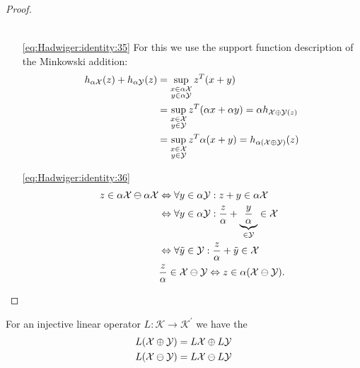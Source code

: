 \begin{proof}
\begin{itemize}
\begin{equation}
\begin{aligned}
	\end{aligned}
\end{equation}
%
\item[\eqref{eq:Hadwiger:identity:35}]
For this we use the support function description of the Minkowski addition:
%
\begin{equation}\begin{aligned}
	h_{\alpha\mathcal X}(z)+h_{\alpha\mathcal Y}(z) &= \sup_{\substack{x\in\alpha\mathcal X\\ y\in\alpha\mathcal Y}}z^T(x+y)\\
	 &= \sup_{\substack{x\in\mathcal X\\ y\in\mathcal Y}} z^T(\alpha x+\alpha y)	 = \alpha h_{\mathcal X\oplus\mathcal Y(z)} \\
	 &= \sup_{\substack{x\in\mathcal X\\ y\in\mathcal Y}} z^T\alpha(x+y) = h_{\alpha(\mathcal X\oplus\mathcal Y)}(z)
\end{aligned}\end{equation}
%
\item[\eqref{eq:Hadwiger:identity:36}]
%
\begin{equation}\begin{aligned}
	z\in\alpha\mathcal X\ominus\alpha\mathcal X&\Leftrightarrow \forall y\in\alpha\mathcal Y: z+y\in\alpha\mathcal X\\
	&\Leftrightarrow \forall y\in\alpha\mathcal Y: \frac{z}{\alpha} + \underbrace{\frac{y}{\alpha}}_{\in\mathcal Y}\in\mathcal X\\
	&\Leftrightarrow \forall \tilde y\in\mathcal Y: \frac{z}{\alpha} + \tilde y\in\mathcal X\\
	& \frac{z}{\alpha}\in\mathcal X\ominus\mathcal Y \Leftrightarrow z\in\alpha(\mathcal X\ominus\mathcal Y).
\end{aligned}\end{equation}
\end{itemize}
%
\end{proof}
%
\mysplit For an injective linear operator $L:\mathcal K\rightarrow \mathcal K^\prime$ we have the 
%
\begin{equation}\begin{aligned}
	L(\mathcal X\oplus\mathcal Y) &= L\mathcal X\oplus L\mathcal Y\\
	L(\mathcal X\ominus\mathcal Y) &= L\mathcal X\ominus L\mathcal Y
\end{aligned}\end{equation}
%
